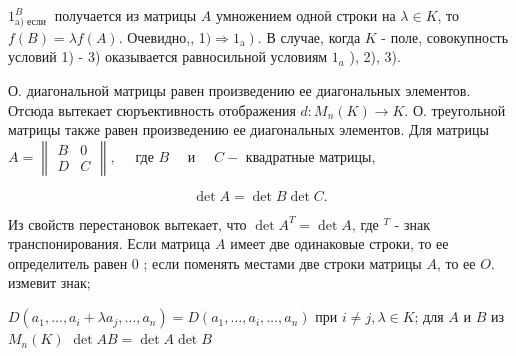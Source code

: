 \documentclass[10pt]{article}
\begin{document}
$1_{\text {a) если }}^{B}$ получается из матрицы $A$ умножением одноӥ строки на $\lambda \in K$, то $f(B)=\lambda f(A)$. Очевидно,, 1$\left.) \Rightarrow 1_{\mathrm{a}}\right)$. В случае, когда $K$ - поле, совокупность условий 1) - 3) оказывается равносильной условиям $1_{a}$ ), 2), 3).



О. диагональной матрицы равен произведению ее диагональных элементов. Отсюда вытекает сюръективность отображения $d: M_{n}(K) \rightarrow K$. О. треугольной матрицы также равен произведению ее диагональных элементов. Для матрицы $A=\left\|\begin{array}{ll}B & 0 \\ D & C\end{array}\right\|, \quad$ где $B \quad$ и $\quad C-$ квадратные матрицы,



\[

\operatorname{det} A=\operatorname{det} B \operatorname{det} C .

\]



Из свойств перестановок вытекает, что $\operatorname{det} A^{T}=\operatorname{det} A$, где ${ }^{T}$ - знак транспонирования. Если матрица $A$ имеет две одинаковые строки, то ее определитель равен 0 ; если поменять местами две строки матрицы $A$, то ее $O$. измевит знак;



$D\left(a_{1}, \ldots, a_{i}+\lambda a_{j}, \ldots, a_{n}\right)=D\left(a_{1}, \ldots, a_{i}, \ldots, a_{n}\right)$ при $i \neq j, \lambda \in K$; для $A$ и $B$ из $M_{n}(K)$ $\operatorname{det} A B=\operatorname{det} A \operatorname{det} B$
\end{document}
